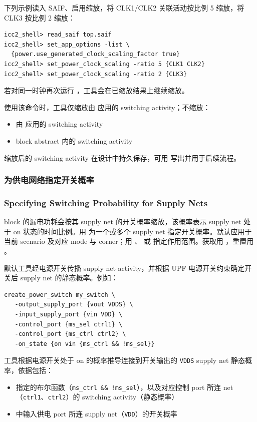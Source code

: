 下列示例读入 SAIF、启用缩放，将 CLK1/CLK2 关联活动按比例 5 缩放，将 CLK3 按比例 2 缩放：
\begin{lstlisting}
icc2_shell> read_saif top.saif
icc2_shell> set_app_options -list \
  {power.use_generated_clock_scaling_factor true}
icc2_shell> set_power_clock_scaling -ratio 5 {CLK1 CLK2}
icc2_shell> set_power_clock_scaling -ratio 2 {CLK3}
\end{lstlisting}

若对同一时钟再次运行 ，工具会在已缩放结果上继续缩放。

使用该命令时，工具仅缩放由  应用的 switching activity；不缩放：
\begin{itemize}
  \item 由  应用的 switching activity
  \item block abstract 内的 switching activity
\end{itemize}

缩放后的 switching activity 在设计中持久保存，可用  写出并用于后续流程。

\subsubsection{为供电网络指定开关概率}
\subsubsection*{Specifying Switching Probability for Supply Nets}

block 的漏电功耗会按其 supply net 的开关概率缩放，该概率表示 supply net 处于 on 状态的时间比例。用  为一个或多个 supply net 指定开关概率。默认应用于当前 scenario 及对应 mode 与 corner；用 、 或  指定作用范围。获取用 ，重置用 。

默认工具经电源开关传播 supply net activity，并根据 UPF 电源开关约束确定开关后 supply net 的静态概率。例如：
\begin{lstlisting}
create_power_switch my_switch \
   -output_supply_port {vout VDDS} \
   -input_supply_port {vin VDD} \
   -control_port {ms_sel ctrl1} \
   -control_port {ms_ctrl ctrl2} \
   -on_state {on vin {ms_ctrl && !ms_sel}}
\end{lstlisting}

工具根据电源开关处于 on 的概率推导连接到开关输出的 \texttt{VDDS} supply net 静态概率，依据包括：
\begin{itemize}
  \item \opt{-on\_state} 指定的布尔函数（\texttt{ms\_ctrl \&\& !ms\_sel}），以及对应控制 port 所连 net（\texttt{ctrl1}、\texttt{ctrl2}）的 switching activity（静态概率）
  \item \opt{-on\_state} 中输入供电 port 所连 supply net（\texttt{VDD}）的开关概率
\end{itemize}

